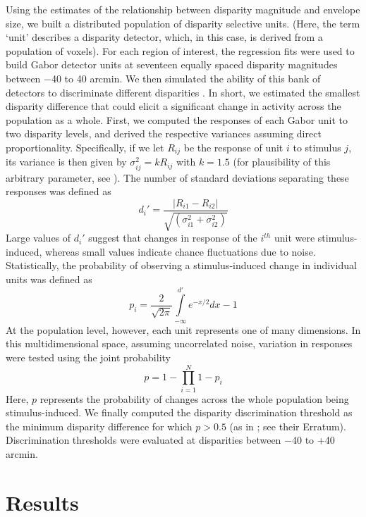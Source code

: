 Using the estimates of the relationship between disparity magnitude and envelope size, we built a distributed population of disparity selective units. (Here, the term `unit' describes a disparity detector, which, in this case, is derived from a population of voxels). For each region of interest, the regression fits were used to build Gabor detector units at seventeen equally spaced disparity magnitudes between $-$40 to 40 arcmin. We then simulated the ability of this bank of detectors to discriminate different disparities \cite{Lehky:1990fk}. In short, we estimated the smallest disparity difference that could elicit a significant change in activity across the population as a whole. First, we computed the responses of each Gabor unit to two disparity levels, and derived the respective variances assuming direct proportionality. Specifically, if we let $R_{ij}$ be the response of unit $i$ to stimulus $j$, its variance is then given by $\sigma_{ij}^2 = kR_{ij}$ with $k = 1.5$ (for plausibility of this arbitrary parameter, see \cite{Lehky:1990fk}). The number of standard deviations separating these responses was defined as 
\begin{equation}
d_i' = \frac{|R_{i1}-R_{i2}|}{\sqrt{(\sigma_{i1}^2+\sigma_{i2}^2)}}
\end{equation}
Large values of $d_i'$ suggest that changes in response of the $i^{th}$ unit were stimulus-induced, whereas small values indicate chance fluctuations due to noise. Statistically, the probability of observing a stimulus-induced change in individual units was defined as
\begin{equation}
p_i=\frac{2}{\sqrt{2\pi}}\int\limits_{-\infty}^{d'}e^{-x/2}dx-1
\end{equation}
At the population level, however, each unit represents one of many dimensions. In this multidimensional space, assuming uncorrelated noise, variation in responses were tested using the joint probability
\begin{equation}
p=1-\prod\limits_{i=1}^N1-p_i
\end{equation}
Here, $p$ represents the probability of changes across the whole population being stimulus-induced. We finally computed the disparity discrimination threshold as the minimum disparity difference for which $p > 0.5$ (as in \cite{Lehky:1990fk}; see their Erratum). Discrimination thresholds were evaluated at disparities between $-$40 to +40 arcmin.

\section{Results}

